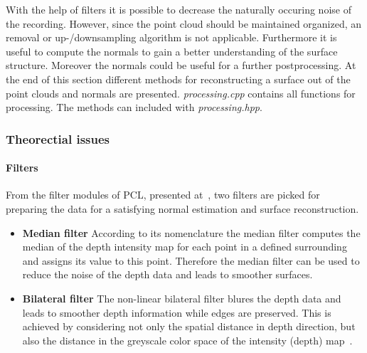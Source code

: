 \documentclass[paper=a4,11pt,bibliography=totoc]{scrartcl}
\begin{document}
With the help of filters it is possible to decrease the naturally occuring noise of the recording. However, since the point cloud should be maintained organized, an removal or up-/downsampling algorithm is not applicable. Furthermore it is useful to compute the normals to gain a better understanding of the surface structure. Moreover the normals could be useful for a further postprocessing. At the end of this section different methods for reconstructing a surface out of the point clouds and normals are presented. \textit{processing.cpp} contains all functions for processing. The methods can included with \textit{processing.hpp}.
%
\subsubsection*{\color{darkgreen}Theorectial issues}
\paragraph*{Filters}
%
From the filter modules of PCL, presented at~\cite{pcldoc}, two filters are picked for preparing the data for a satisfying normal estimation and surface reconstruction.
\begin{itemize}
\item \textbf{Median filter}
According to its nomenclature the median filter computes the median of the depth intensity map for each point in a defined surrounding and assigns its value to this point. Therefore the median filter can be used to reduce the noise of the depth data and leads to smoother surfaces.
\item \textbf{Bilateral filter}
The non-linear bilateral filter blures the depth data and leads to smoother depth information while edges are preserved. This is achieved by considering not only the spatial distance in depth direction, but also the distance in the greyscale color space of the intensity (depth) map~\cite{bilateral}. 
\end{itemize}
%
\end{document}
